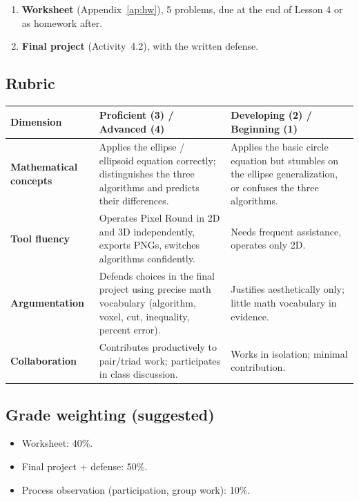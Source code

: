 \documentclass[12pt,letterpaper]{scrartcl}
\begin{document}
\begin{enumerate}[leftmargin=1.5em,itemsep=0.2em,topsep=0.3em,nosep]
  \item \textbf{Worksheet} (Appendix~\ref{ap:hw}), 5 problems, due at the end of Lesson 4 or as homework after.
  \item \textbf{Final project} (Activity~4.2), with the written defense.
\end{enumerate}

\subsection{Rubric}

\begin{center}
\small
\begin{tabularx}{\textwidth}{@{}p{}XX@{}}
\toprule
\textbf{Dimension} & \textbf{Proficient (3) / Advanced (4)} & \textbf{Developing (2) / Beginning (1)} \\
\midrule
\textbf{Mathematical concepts} & Applies the ellipse / ellipsoid equation correctly; distinguishes the three algorithms and predicts their differences. & Applies the basic circle equation but stumbles on the ellipse generalization, or confuses the three algorithms. \\
\addlinespace[3pt]
\textbf{Tool fluency} & Operates Pixel Round in 2D and 3D independently, exports PNGs, switches algorithms confidently. & Needs frequent assistance, operates only 2D. \\
\addlinespace[3pt]
\textbf{Argumentation} & Defends choices in the final project using precise math vocabulary (algorithm, voxel, cut, inequality, percent error). & Justifies aesthetically only; little math vocabulary in evidence. \\
\addlinespace[3pt]
\textbf{Collaboration} & Contributes productively to pair/triad work; participates in class discussion. & Works in isolation; minimal contribution. \\
\bottomrule
\end{tabularx}
\end{center}

\subsection{Grade weighting (suggested)}
\begin{itemize}[leftmargin=1.3em,itemsep=0.1em,topsep=0.2em,nosep]
  \item Worksheet: 40\%.
  \item Final project + defense: 50\%.
  \item Process observation (participation, group work): 10\%.
\end{itemize}
\end{document}
